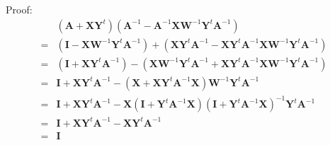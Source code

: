 \documentclass[22pt]{article}
\begin{document}
	Proof:
	\begin{align}
		& (\mathbf{A}+\mathbf{XY}^t)(\mathbf{A}^{-1}-\mathbf{A}^{-1}\mathbf{XW}^{-1}\mathbf{Y}^t\mathbf{A}^{-1}) \\
		= & (\mathbf{I} - \mathbf{XW}^{-1}\mathbf{Y}^t\mathbf{A}^{-1})+(\mathbf{XY}^t\mathbf{A}^{-1}-\mathbf{XY}^t\mathbf{A}^{-1}\mathbf{XW}^{-1}\mathbf{Y}^t\mathbf{A}^{-1}) \\
		= & (\mathbf{I}+\mathbf{XY}^t\mathbf{A}^{-1}) - (\mathbf{XW}^{-1}\mathbf{Y}^t\mathbf{A}^{-1}+\mathbf{XY}^t\mathbf{A}^{-1}\mathbf{XW}^{-1}\mathbf{Y}^t\mathbf{A}^{-1})\\
		= & \mathbf{I}+\mathbf{XY}^t\mathbf{A}^{-1} - (\mathbf{X}+ \mathbf{XY}^t\mathbf{A}^{-1}\mathbf{X})\mathbf{W}^{-1}\mathbf{Y}^t\mathbf{A}^{-1}\\
		= & \mathbf{I}+\mathbf{XY}^t\mathbf{A}^{-1} - \mathbf{X}(\mathbf{I}+\mathbf{Y}^t\mathbf{A}^{-1}\mathbf{X})(\mathbf{I}+\mathbf{Y}^t\mathbf{A}^{-1}\mathbf{X})^{-1}\mathbf{Y}^t\mathbf{A}^{-1}\\
		= & \mathbf{I} + \mathbf{XY}^t\mathbf{A}^{-1} - \mathbf{XY}^t\mathbf{A}^{-1}\\
		= & \mathbf{I}
	\end{align}
\end{document}
